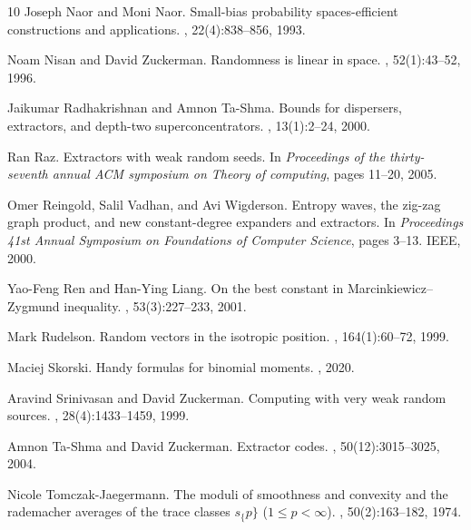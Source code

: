 \documentclass[10pt,a4paper]{article}
\newcommand{\1}{\mathbbm{1}}
\begin{document}
\begin{thebibliography}{10}
Joseph Naor and Moni Naor.
\newblock Small-bias probability spaces-efficient constructions and
  applications.
, 22(4):838--856, 1993.

Noam Nisan and David Zuckerman.
\newblock Randomness is linear in space.
, 52(1):43--52, 1996.

Jaikumar Radhakrishnan and Amnon {Ta-Shma}.
\newblock Bounds for dispersers, extractors, and depth-two superconcentrators.
, 13(1):2--24, 2000.

Ran Raz.
\newblock Extractors with weak random seeds.
\newblock In {\em Proceedings of the thirty-seventh annual ACM symposium on
  Theory of computing}, pages 11--20, 2005.

Omer Reingold, Salil Vadhan, and Avi Wigderson.
\newblock Entropy waves, the zig-zag graph product, and new constant-degree
  expanders and extractors.
\newblock In {\em Proceedings 41st Annual Symposium on Foundations of Computer
  Science}, pages 3--13. IEEE, 2000.

Yao-Feng Ren and Han-Ying Liang.
\newblock On the best constant in {Marcinkiewicz--Zygmund} inequality.
, 53(3):227--233, 2001.

Mark Rudelson.
\newblock Random vectors in the isotropic position.
, 164(1):60--72, 1999.

Maciej Skorski.
\newblock Handy formulas for binomial moments.
, 2020.

Aravind Srinivasan and David Zuckerman.
\newblock Computing with very weak random sources.
, 28(4):1433--1459, 1999.

Amnon {Ta-Shma} and David Zuckerman.
\newblock Extractor codes.
, 50(12):3015--3025,
  2004.

Nicole Tomczak-Jaegermann.
\newblock The moduli of smoothness and convexity and the rademacher averages of
  the trace classes $s_\{p\}$ ($1\leq p < \infty$).
, 50(2):163--182, 1974.


\end{thebibliography}
\end{document}
